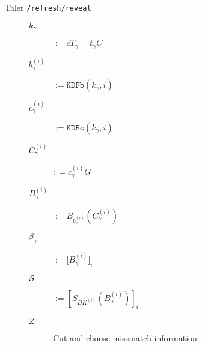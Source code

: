 \begin{frame}{Taler {\tt /refresh/reveal}}
\begin{figure}[th]
\begin{minipage}[b]{0.45\linewidth}
\begin{description}
      \item[$k_\gamma$] $:= c T_\gamma = t_\gamma C$ 
      \item[$b_\gamma^{(i)}$] $:= \texttt{KDFb}(k_\gamma,i)$ 
      \item[$c_\gamma^{(i)}$] $:= \texttt{KDFc}(k_\gamma,i)$ 
      \item[$C_\gamma^{(i)}$] $: = c_\gamma^{(i)} G$ 

      \item[$B_\gamma^{(i)}$] $:= B_{b_\gamma^{(i)}}(C_\gamma^{(i)})$
      \item[$\beta_\gamma$] $:= \big[ B_\gamma^{(i)} \big]_i$
      \item[$\cal S$] $:= \left[ S_{DK^{(i)}}( B_\gamma^{(i)} ) \right]_i$ \\ \smallskip

      \item[$Z$] Cut-and-choose missmatch information
      \end{description}
    \end{minipage}
  \end{figure}
\end{frame}


